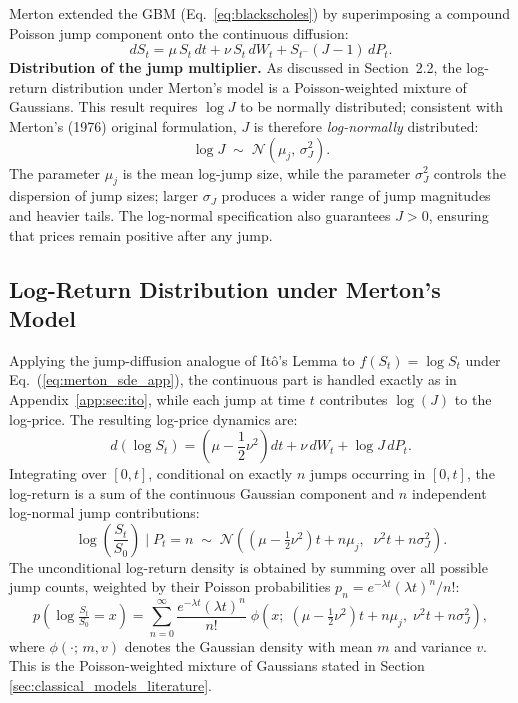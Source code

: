 Merton \cite{merton1976option} extended the GBM (Eq.~\ref{eq:blackscholes}) by
superimposing a compound Poisson jump component onto the continuous diffusion:
\[
    \label{eq:merton_sde_app}
    dS_t = \mu\, S_t\, dt + \nu\, S_t\, dW_t + S_{t^-}(J - 1)\, dP_t.
\]
\textbf{Distribution of the jump multiplier.} As discussed in Section~2.2, the
log-return distribution under Merton's model is a Poisson-weighted mixture of
Gaussians. This result requires $\log J$ to be normally distributed; consistent
with Merton's (1976) original formulation, $J$ is therefore \textit{log-normally}
distributed:
\begin{equation}
    \label{eq:jump_lognormal_app}
    \log J \;\sim\; \mathcal{N}(\mu_j,\, \sigma_J^2).
\end{equation}
The parameter $\mu_j$ is the mean log-jump size, while the parameter $\sigma_J^2$ controls the dispersion of jump
sizes; larger $\sigma_J$ produces a wider range of jump magnitudes and heavier
tails. The log-normal specification also guarantees $J > 0$, ensuring that
prices remain positive after any jump.

\subsection{Log-Return Distribution under Merton's Model}

Applying the jump-diffusion analogue of It\^{o}'s Lemma to $f(S_t) = \log S_t$
under Eq.~(\ref{eq:merton_sde_app}), the continuous part is handled exactly as
in Appendix~\ref{app:sec:ito}, while each jump at time $t$ contributes
$\log(J)$ to the log-price. The resulting log-price dynamics are:
\[
    d(\log S_t) = \left(\mu - \frac{1}{2}\nu^2\right)\! dt
                + \nu\, dW_t + \log J\, dP_t.
\]
Integrating over $[0, t]$, conditional on exactly $n$ jumps occurring in
$[0, t]$, the log-return is a sum of the continuous
Gaussian component and $n$ independent log-normal jump contributions:
\[
    \log\!\left(\frac{S_t}{S_0}\right) \;\Bigg|\; P_t = n
    \;\sim\; \mathcal{N}\!\left(\left(\mu - \tfrac{1}{2}\nu^2\right)t
    + n\mu_j,\;\; \nu^2 t + n\sigma_J^2\right).
\]
The unconditional log-return density is obtained by summing over all
possible jump counts, weighted by their Poisson probabilities
$p_n = e^{-\lambda t}(\lambda t)^n / n!$:
\begin{equation}
    \label{eq:merton_return_dist}
    p\!\left(\log\tfrac{S_t}{S_0} = x\right)
    = \sum_{n=0}^{\infty}
    \frac{e^{-\lambda t}(\lambda t)^n}{n!}\;
    \phi\!\left(x;\;
    \left(\mu - \tfrac{1}{2}\nu^2\right)t + n\mu_j,\;
    \nu^2 t + n\sigma_J^2\right),
\end{equation}
where $\phi(\cdot;\, m, v)$ denotes the Gaussian density with mean $m$ and
variance $v$. This is the Poisson-weighted mixture of Gaussians stated in
Section \ref{sec:classical_models_literature}.


